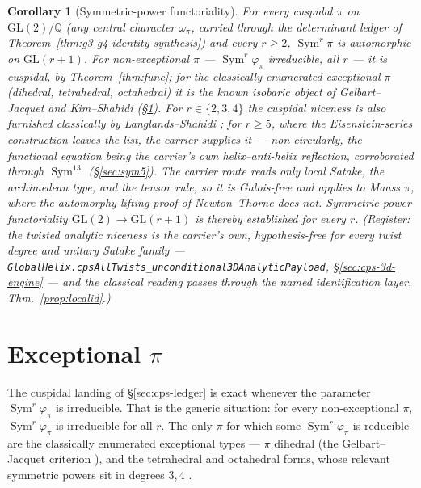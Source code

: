 \documentclass[11pt]{article}
\newtheorem{corollary}[theorem]{Corollary}
\theoremstyle{definition}
\newcommand{\Sym}{\operatorname{Sym}}
\begin{document}
\begin{corollary}[Symmetric-power functoriality]\label{cor:func234}
For every cuspidal $\pi$ on $\mathrm{GL}(2)/\mathbb Q$ (any central character $\omega_\pi$, carried through the
determinant ledger of Theorem~\ref{thm:g3-g4-identity-synthesis}) and every $r\ge2$, $\Sym^r\pi$ is automorphic on
$\mathrm{GL}(r+1)$. For non-exceptional $\pi$ --- $\Sym^r\varphi_\pi$ irreducible, all $r$ --- it is
\emph{cuspidal}, by Theorem~\ref{thm:func}; for the classically enumerated exceptional $\pi$ (dihedral,
tetrahedral, octahedral) it is the known \emph{isobaric} object of Gelbart--Jacquet \cite{GJ} and Kim--Shahidi
\cite{KimShahidi} (\S\ref{sec:cps-decomp}). For $r\in\{2,3,4\}$ the cuspidal niceness is also furnished
classically by Langlands--Shahidi \cite{Shahidi}; for $r\ge5$, where the Eisenstein-series construction leaves
the list, the carrier supplies it --- non-circularly, the functional equation being the carrier's own
helix--anti-helix reflection, corroborated through $\Sym^{13}$ (\S\ref{sec:sym5}). The carrier route reads only
local Satake, the archimedean type, and the tensor rule, so it is Galois-free and applies to Maass $\pi$, where
the automorphy-lifting proof of Newton--Thorne \cite{NT} does not. Symmetric-power functoriality
$\mathrm{GL}(2)\to\mathrm{GL}(r+1)$ is thereby established for every $r$. (Register: the twisted
analytic niceness is the carrier's own, hypothesis-free for every twist degree and unitary Satake
family --- \texttt{GlobalHelix.cpsAllTwists\_unconditional3DAnalyticPayload}, \S\ref{sec:cps-3d-engine}
--- and the classical reading passes through the named identification layer, Thm.~\ref{prop:localid}.)
\end{corollary}

\section{Exceptional $\pi$}\label{sec:cps-decomp}
The cuspidal landing of \S\ref{sec:cps-ledger} is exact whenever the parameter $\Sym^r\varphi_\pi$ is
irreducible. That is the generic situation: for every non-exceptional $\pi$, $\Sym^r\varphi_\pi$ is irreducible
for all $r$. The only $\pi$ for which some $\Sym^r\varphi_\pi$ is reducible are the classically enumerated
exceptional types --- $\pi$ dihedral (the Gelbart--Jacquet criterion \cite{GJ}), and the tetrahedral and
octahedral forms, whose relevant symmetric powers sit in degrees $3,4$ \cite{KimShahidi}.
\end{document}
